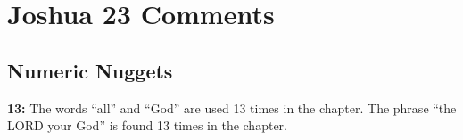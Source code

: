 \section{Joshua 23 Comments}

\subsection{Numeric Nuggets}
\textbf{13: } The words ``all'' and ``God'' are used 13 times in the chapter. The phrase ``the LORD your God'' is found 13 times in the chapter.

